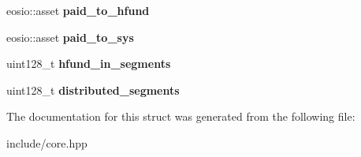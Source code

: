 \begin{DoxyCompactItemize}
\mbox{\label{structeosio_1_1sincome_a155131761ff58563e6bc92a5b7388c4a}} 
eosio\+::asset {\bfseries paid\+\_\+to\+\_\+hfund}
\item 
\mbox{\label{structeosio_1_1sincome_aa6ace96aa93b3e099d90b38067e918a8}} 
eosio\+::asset {\bfseries paid\+\_\+to\+\_\+sys}
\item 
\mbox{\label{structeosio_1_1sincome_a77757a55a857d74d8eff53d8a4d5f1de}} 
uint128\+\_\+t {\bfseries hfund\+\_\+in\+\_\+segments}
\item 
\mbox{\label{structeosio_1_1sincome_aeceec0f13914abf9c5062ee4e19368e2}} 
uint128\+\_\+t {\bfseries distributed\+\_\+segments}
\end{DoxyCompactItemize}


The documentation for this struct was generated from the following file\+:\begin{DoxyCompactItemize}
\item 
include/core.\+hpp\end{DoxyCompactItemize}
